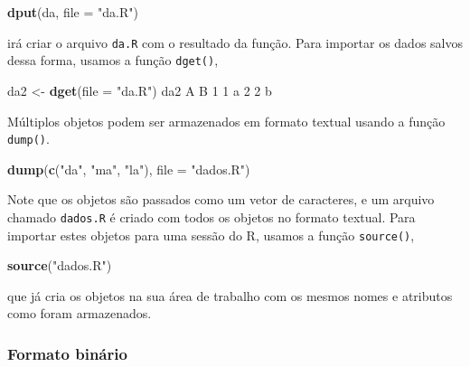 \documentclass[10pt,a4paper]{book}
\newenvironment{Shaded}{\begin{snugshade}}{\end{snugshade}}
\newcommand{\KeywordTok}[1]{\textcolor[rgb]{0.13,0.29,0.53}{\textbf{#1}}}
\newcommand{\DataTypeTok}[1]{\textcolor[rgb]{0.13,0.29,0.53}{#1}}
\newcommand{\DecValTok}[1]{\textcolor[rgb]{0.00,0.00,0.81}{#1}}
\newcommand{\StringTok}[1]{\textcolor[rgb]{0.31,0.60,0.02}{#1}}
\newcommand{\NormalTok}[1]{#1}
\begin{document}
\begin{Shaded}
\begin{Highlighting}[]
\KeywordTok{dput}\NormalTok{(da, }\DataTypeTok{file =} \StringTok{"da.R"}\NormalTok{)}
\end{Highlighting}
\end{Shaded}

irá criar o arquivo \texttt{da.R} com o resultado da função. Para
importar os dados salvos dessa forma, usamos a função \texttt{dget()},

\begin{Shaded}
\begin{Highlighting}[]
\NormalTok{da2 <-}\StringTok{ }\KeywordTok{dget}\NormalTok{(}\DataTypeTok{file =} \StringTok{"da.R"}\NormalTok{)}
\NormalTok{da2}
\NormalTok{  A B}
\DecValTok{1} \DecValTok{1}\NormalTok{ a}
\DecValTok{2} \DecValTok{2}\NormalTok{ b}
\end{Highlighting}
\end{Shaded}

Múltiplos objetos podem ser armazenados em formato textual usando a
função \texttt{dump()}.

\begin{Shaded}
\begin{Highlighting}[]
\KeywordTok{dump}\NormalTok{(}\KeywordTok{c}\NormalTok{(}\StringTok{"da"}\NormalTok{, }\StringTok{"ma"}\NormalTok{, }\StringTok{"la"}\NormalTok{), }\DataTypeTok{file =} \StringTok{"dados.R"}\NormalTok{)}
\end{Highlighting}
\end{Shaded}

Note que os objetos são passados como um vetor de caracteres, e um
arquivo chamado \texttt{dados.R} é criado com todos os objetos no
formato textual. Para importar estes objetos para uma sessão do R,
usamos a função \texttt{source()},

\begin{Shaded}
\begin{Highlighting}[]
\KeywordTok{source}\NormalTok{(}\StringTok{"dados.R"}\NormalTok{)}
\end{Highlighting}
\end{Shaded}

que já cria os objetos na sua área de trabalho com os mesmos nomes e
atributos como foram armazenados.

\subsubsection{Formato binário}\label{formato-binuxe1rio}
\end{document}
